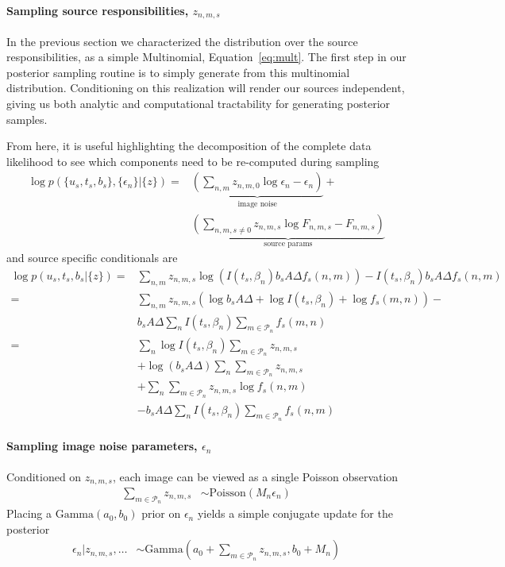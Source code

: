 \documentclass[11pt]{article}
\begin{document}
\paragraph{Sampling source responsibilities, $z_{n,m,s}$}
In the previous section we characterized the distribution over the source responsibilities, as a simple Multinomial, Equation~\ref{eq:mult}. The first step in our posterior sampling routine is to simply generate from this multinomial distribution. Conditioning on this realization will render our sources independent, giving us both analytic and computational tractability for generating posterior samples.  

From here, it is useful highlighting the decomposition of the complete data likelihood to see which components need to be re-computed during sampling 
\begin{align}
  \log p( \{u_s, t_s, b_s\}, \{ \epsilon_n\} | \{ z \})
  =& \underbrace{\left( \sum_{n,m} z_{n,m,0} \log \epsilon_n - \epsilon_n \right)}_{\text{image noise}} + \\
     & \underbrace{\left(\sum_{n,m,s\neq 0} z_{n,m,s} \log F_{n,m,s} - F_{n,m,s}\right)}_{\text{source params}} 
\end{align}
and source specific conditionals are
\begin{align}
\log p(u_s, t_s, b_s | \{z\}) 
  =& \sum_{n,m} z_{n,m,s} \log\left(I(t_s,\beta_n) b_s A \Delta f_s(n,m) \right) - I(t_s,\beta_n) b_s A \Delta f_s(n,m)\\
  =& \sum_{n,m} z_{n,m,s} \left(\log b_s A \Delta + \log I(t_s, \beta_n) + \log f_s(m,n) \right) - \\
   & b_s A \Delta \sum_{n} I(t_s, \beta_n) \sum_{m \in \mathcal{P}_n} f_s(m,n) \\
  =& \sum_{n} \log I(t_s, \beta_n) \sum_{m \in \mathcal{P}_n} z_{n,m,s} \\
   & + \log (b_s A \Delta) \sum_{n} \sum_{m \in \mathcal{P}_n} z_{n,m,s} \\
   & + \sum_{n} \sum_{m \in \mathcal{P}_n} z_{n,m,s} \log f_s(n,m) \\
   & - b_s A \Delta \sum_{n} I(t_s, \beta_n) \sum_{m \in \mathcal{P}_n} f_s(n,m)
\end{align}


\paragraph{Sampling image noise parameters, $\epsilon_n$}
Conditioned on $z_{n,m,s}$, each image can be viewed as a single Poisson observation
\begin{align}
  \sum_{m \in \mathcal{P}_n} z_{n,m,s} &\sim \textrm{Poisson}(M_n \epsilon_n)
\end{align}
Placing a $\textrm{Gamma}(a_0, b_0)$ prior on $\epsilon_n$ yields a simple conjugate update for the posterior 
\begin{align}
  \epsilon_n | z_{n,m,s}, \dots &\sim \textrm{Gamma}\left(a_0 + \sum_{m\in \mathcal{P}_n} z_{n,m,s}, b_0 + M_n \right)
\end{align}
 
\end{document}

